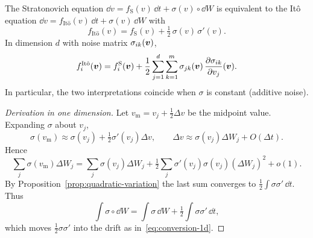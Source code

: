 \begin{proposition}
\label{prop:ito-strat-conversion}
The Stratonovich equation $\dd v=f_{\mathrm S}(v)\,\dd t+\sigma(v)\circ\dd W$ is equivalent to the It\^o equation $\dd v=f_{\mathrm{It\hat o}}(v)\,\dd t+\sigma(v)\,\dd W$ with
\begin{equation}
\label{eq:conversion-1d}
f_{\mathrm{It\hat o}}(v)=f_{\mathrm S}(v)+\tfrac12\,\sigma(v)\,\sigma'(v).
\end{equation}
In dimension $d$ with noise matrix $\sigma_{ik}(\bm{v})$,
\begin{equation}
\label{eq:conversion-nd}
f^{\mathrm{It\hat o}}_i(\bm{v})=f^{\mathrm S}_i(\bm{v})+\frac12\sum_{j=1}^d\sum_{k=1}^m\sigma_{jk}(\bm{v})\,\frac{\partial\sigma_{ik}}{\partial v_j}(\bm{v}).
\end{equation}
In particular, the two interpretations coincide when $\sigma$ is constant (additive noise).
\end{proposition}

\begin{proof}[Derivation in one dimension]
Let $v_{\mathrm m}=v_j+\tfrac12\Delta v$ be the midpoint value. Expanding $\sigma$ about $v_j$,
\[
\sigma(v_{\mathrm m})\approx\sigma(v_j)+\tfrac12\sigma'(v_j)\Delta v,\qquad \Delta v\approx\sigma(v_j)\Delta W_j+O(\Delta t).
\]
Hence
\[
\sum_j\sigma(v_{\mathrm m})\Delta W_j=\sum_j\sigma(v_j)\Delta W_j+\tfrac12\sum_j\sigma'(v_j)\sigma(v_j)(\Delta W_j)^2+o(1).
\]
By Proposition~\ref{prop:quadratic-variation} the last sum converges to $\tfrac12\int\sigma\sigma'\,\dd t$. Thus
\[
\int\sigma\circ\dd W=\int\sigma\,\dd W+\tfrac12\int\sigma\sigma'\,\dd t,
\]
which moves $\tfrac12\sigma\sigma'$ into the drift as in~\eqref{eq:conversion-1d}.
\end{proof}

